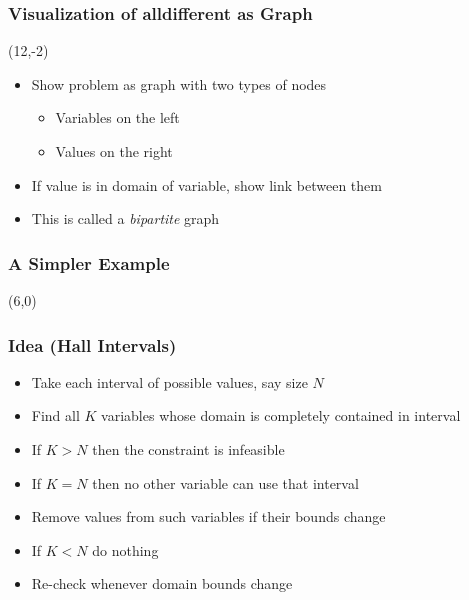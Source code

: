 \documentclass{beamer}
\begin{document}
\begin{frame}
\frametitle{Visualization of alldifferent as Graph}
\begin{textblock}{5.5}(12,-2)
\end{textblock}
\begin{itemize}
\item Show problem as graph with two types of nodes
\begin{itemize}
\item Variables on the left
\item Values on the right
\end{itemize}
\item If value is in domain of variable, show link between them
\item This is called a {\em bipartite} graph
\end{itemize}
\end{frame}

\begin{frame}[fragile]
\frametitle{A Simpler Example}
\begin{textblock}{8}(6,0)
\end{textblock}

\end{frame}

\begin{frame}
\frametitle{Idea (Hall Intervals)}
\begin{itemize}
\item Take each interval of possible values, say size $N$
\item Find all $K$ variables whose domain is completely contained in interval
\item If $K>N$ then the constraint is infeasible
\item If $K=N$ then no other variable can use that interval
\item Remove values from such variables if their bounds change
\item If $K<N$ do nothing
\item Re-check whenever domain bounds change
\end{itemize}
\end{frame}
\end{document}
